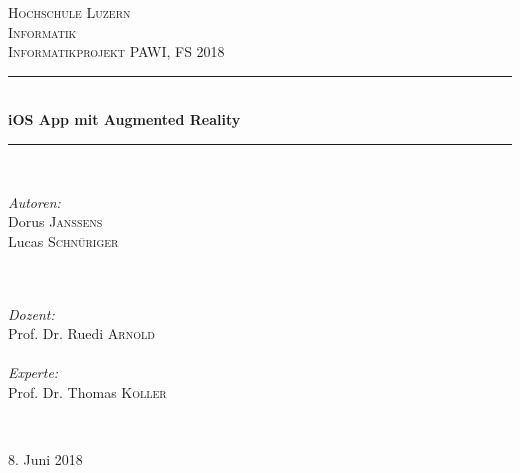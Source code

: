 \documentclass[11pt]{article} %
\begin{document}
\begin{titlepage}

\newcommand{\HRule}{\rule{\linewidth}{0.5mm}} %

\center

\textsc{\LARGE Hochschule Luzern\\Informatik}\\[1.5cm] %
\textsc{\Large Informatikprojekt PAWI, FS 2018}\\[1.5cm] %

\HRule \\[1cm]
{\huge \bfseries iOS App mit Augmented Reality}\\[0.6cm] %
\HRule \\[1cm]

\vspace{30pt}

\begin{minipage}{0.4\textwidth}
  \begin{flushleft} \large
    \emph{Autoren:}\\
    Dorus \textsc{Janssens}\\
    Lucas \textsc{Schnüriger}\\
    ~\\~ %
  \end{flushleft}
\end{minipage}
\begin{minipage}{0.4\textwidth}
  \begin{flushleft} \large
    \emph{Dozent:}\\
    Prof. Dr. Ruedi \textsc{Arnold}\\~\\
    \emph{Experte:}\\
    Prof. Dr. Thomas \textsc{Koller}
  \end{flushleft}
\end{minipage}\\[1cm]


\vspace{30pt}

{\large 8. Juni 2018}\\[1cm] %

\end{titlepage}
\end{document}
